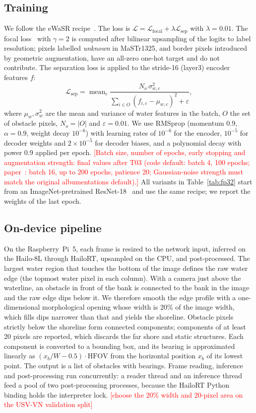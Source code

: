 \documentclass[conference]{IEEEtran}
\newcommand{\tbd}[1]{\textcolor{red}{[#1]}}
\begin{document}
\subsection{Training}
\label{sec:training}
We follow the eWaSR recipe~\cite{tersek2023ewasr,bovcon2022wasr}. The loss is $\mathcal{L}=\mathcal{L}_{\mathrm{focal}}+\lambda\mathcal{L}_{\mathrm{sep}}$ with $\lambda=0.01$. The focal loss~\cite{lin2017focal} with $\gamma=2$ is computed after bilinear upsampling of the logits to label resolution; pixels labelled \emph{unknown} in MaSTr1325, and border pixels introduced by geometric augmentation, have an all-zero one-hot target and do not contribute. The separation loss is applied to the stride-16 (layer3) encoder features $f$:
\begin{equation}
\mathcal{L}_{\mathrm{sep}}=\operatorname{mean}_c\frac{N_o\,\sigma^2_{w,c}}{\sum_{i\in O}(f_{i,c}-\mu_{w,c})^2+\varepsilon},
\end{equation}
where $\mu_w,\sigma^2_w$ are the mean and variance of water features in the batch, $O$ the set of obstacle pixels, $N_o=|O|$ and $\varepsilon=0.01$. We use RMSprop (momentum 0.9, $\alpha=0.9$, weight decay $10^{-6}$) with learning rates of $10^{-6}$ for the encoder, $10^{-5}$ for decoder weights and $2\times10^{-5}$ for decoder biases, and a polynomial decay with power 0.9 applied per epoch. \tbd{Batch size, number of epochs, early stopping and augmentation strength: final values after T03 (code default: batch 4, 100 epochs; paper~\cite{tersek2023ewasr}: batch 16, up to 200 epochs, patience 20; Gaussian-noise strength must match the original albumentations default).} All variants in Table~\ref{tab:fp32} start from an ImageNet-pretrained ResNet-18~\cite{he2016resnet} and use the same recipe; we report the weights of the last epoch.

\subsection{On-device pipeline}
On the Raspberry~Pi~5, each frame is resized to the network input, inferred on the Hailo-8L through HailoRT, upsampled on the CPU, and post-processed. The largest water region that touches the bottom of the image defines the raw water edge (the topmost water pixel in each column). With a camera just above the waterline, an obstacle in front of the bank is connected to the bank in the image and the raw edge dips below it. We therefore smooth the edge profile with a one-dimensional morphological opening whose width is 20\% of the image width, which fills dips narrower than that and yields the shoreline. Obstacle pixels strictly below the shoreline form connected components; components of at least 20 pixels are reported, which discards the far shore and static structures. Each component is converted to a bounding box, and its bearing is approximated linearly as $(x_b/W-0.5)\cdot\mathrm{HFOV}$ from the horizontal position $x_b$ of its lowest point. The output is a list of obstacles with bearings. Frame reading, inference and post-processing run concurrently: a reader thread and an inference thread feed a pool of two post-processing processes, because the HailoRT Python binding holds the interpreter lock. \tbd{choose the 20\% width and 20-pixel area on the USV-VN validation split}
\end{document}
